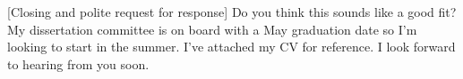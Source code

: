 [Closing and polite request for response] Do you think this sounds like a good fit? My dissertation committee is on board with a May graduation date so I’m looking to start in the summer. I’ve attached my CV for reference. I look forward to hearing from you soon.


\makeletterclosing

\clearpage
